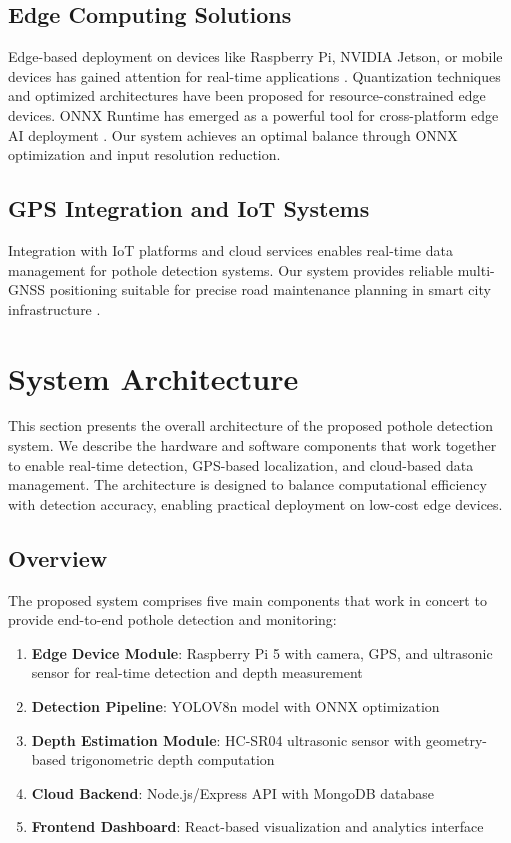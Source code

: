 \documentclass{ieeeaccess}
\begin{document}
\subsection{Edge Computing Solutions}
Edge-based deployment on devices like Raspberry Pi, NVIDIA Jetson, or mobile devices has gained attention for real-time applications \cite{b9, b7}. Quantization techniques \cite{b10} and optimized architectures \cite{b8} have been proposed for resource-constrained edge devices. ONNX Runtime has emerged as a powerful tool for cross-platform edge AI deployment \cite{b14, b15}. Our system achieves an optimal balance through ONNX optimization and input resolution reduction.

\subsection{GPS Integration and IoT Systems}
Integration with IoT platforms and cloud services enables real-time data management for pothole detection systems. Our system provides reliable multi-GNSS positioning suitable for precise road maintenance planning in smart city infrastructure \cite{b16, b17}.

\section{System Architecture}

This section presents the overall architecture of the proposed pothole detection system. We describe the hardware and software components that work together to enable real-time detection, GPS-based localization, and cloud-based data management. The architecture is designed to balance computational efficiency with detection accuracy, enabling practical deployment on low-cost edge devices.

\subsection{Overview}
The proposed system comprises five main components that work in concert to provide end-to-end pothole detection and monitoring:
\begin{enumerate}
    \item \textbf{Edge Device Module}: Raspberry Pi 5 with camera, GPS, and ultrasonic sensor for real-time detection and depth measurement
    \item \textbf{Detection Pipeline}: YOLOV8n model with ONNX optimization
    \item \textbf{Depth Estimation Module}: HC-SR04 ultrasonic sensor with geometry-based trigonometric depth computation
    \item \textbf{Cloud Backend}: Node.js/Express API with MongoDB database
    \item \textbf{Frontend Dashboard}: React-based visualization and analytics interface
\end{enumerate}
\end{document}
